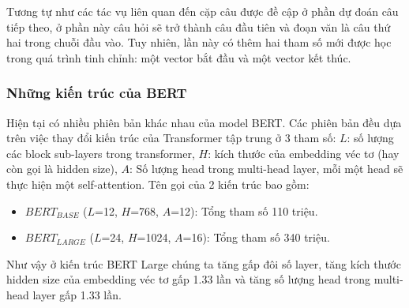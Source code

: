 Tương tự như các tác vụ liên quan đến cặp câu được đề cập ở phần dự đoán câu tiếp theo, ở phần này câu hỏi sẽ trở thành câu đầu tiên và đoạn văn là câu thứ hai trong chuỗi đầu vào. Tuy nhiên, lần này có thêm hai tham số mới được học trong quá trình tinh chỉnh: một vector bắt đầu và một vector kết thúc.

\subsubsection{Những kiến trúc của BERT}
Hiện tại có nhiều phiên bản khác nhau của model BERT. Các phiên bản đều dựa trên việc thay đổi kiến trúc của Transformer tập trung ở 3 tham số: $L$: số lượng các block sub-layers trong transformer, $H$: kích thước của embedding véc tơ (hay còn gọi là hidden size), $A$: Số lượng head trong multi-head layer, mỗi một head sẽ thực hiện một self-attention. Tên gọi của 2 kiến trúc bao gồm:
\begin{itemize}
    \item $BERT_{BASE}$ ($L$=12, $H$=768, $A$=12): Tổng tham số 110 triệu.
    \item $BERT_{LARGE}$ ($L$=24, $H$=1024, $A$=16): Tổng tham số 340 triệu.
\end{itemize}
Như vậy ở kiến trúc BERT Large chúng ta tăng gấp đôi số layer, tăng kích thước hidden size của embedding véc tơ gấp 1.33 lần và tăng số lượng head trong multi-head layer gấp 1.33 lần.


